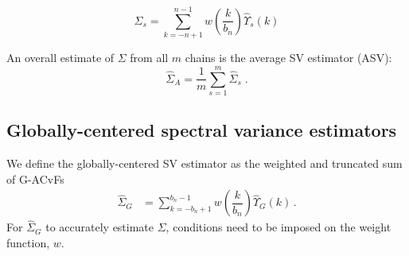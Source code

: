 \documentclass[11pt]{article}
\theoremstyle{remark}
\begin{document}
\begin{equation} \label{eq:sve}
    \hat{\Sigma}_{s} = \sum_{k=-n+1}^{n-1}w\left(\dfrac{k}{b_n}\right)\hat{\Upsilon}_s(k)
\end{equation}

An overall estimate of $\Sigma$ from all $m$ chains is the average SV estimator (ASV):
\[
\hat{\Sigma}_A = \dfrac{1}{m}\sum_{s=1}^{m}\hat{\Sigma}_{s}\;.
\]

\subsection{Globally-centered spectral variance estimators} %
\label{sub:globally_centered_spectral_variance_estimators}




We define the globally-centered SV estimator as the weighted and truncated sum of G-ACvFs
%
%
\begin{align*}
    \hat{\Sigma}_{G} &= \sum_{k=-b_n+1}^{b_n-1}w\left(\dfrac{k}{b_n}\right)\hat{\Upsilon}_{G}(k)\,.
\end{align*}
For $\hat{\Sigma}_{G}$ to accurately estimate $\Sigma$, conditions need to be imposed on the weight function, $w$. 
%
\end{document}
